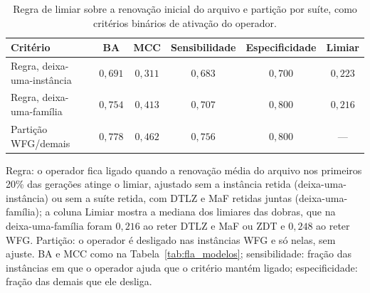 \begin{table}[!htb]
    \centering
    \small
    \caption{Regra de limiar sobre a renovação inicial do arquivo e partição por suíte, como critérios binários de ativação do operador.}
    \label{tab:dinamica_limiar}
    \begin{tabular*}{\textwidth}{@{\extracolsep{\fill}}lccccc@{}}
        \toprule
        \textbf{Critério} & \textbf{BA} & \textbf{MCC} & \textbf{Sensibilidade} & \textbf{Especificidade} & \textbf{Limiar} \\
        \midrule
        Regra, deixa-uma-instância & $0{,}691$ & $0{,}311$ & $0{,}683$ & $0{,}700$ & $0{,}223$ \\
        Regra, deixa-uma-família & $0{,}754$ & $0{,}413$ & $0{,}707$ & $0{,}800$ & $0{,}216$ \\
        \midrule
        Partição WFG/demais & $0{,}778$ & $0{,}462$ & $0{,}756$ & $0{,}800$ & --- \\
        \bottomrule
    \end{tabular*}
    \par\smallskip
    \parbox{\textwidth}{\footnotesize
    Regra: o operador fica ligado quando a renovação média do arquivo nos primeiros 20\% das gerações atinge o limiar, ajustado sem a instância retida (deixa-uma-instância) ou sem a suíte retida, com DTLZ e MaF retidas juntas (deixa-uma-família); a coluna Limiar mostra a mediana dos limiares das dobras, que na deixa-uma-família foram $0{,}216$ ao reter DTLZ e MaF ou ZDT e $0{,}248$ ao reter WFG. Partição: o operador é desligado nas instâncias WFG e só nelas, sem ajuste. BA e MCC como na Tabela~\ref{tab:fla_modelos}; sensibilidade: fração das instâncias em que o operador ajuda que o critério mantém ligado; especificidade: fração das demais que ele desliga.
    }
\end{table}
